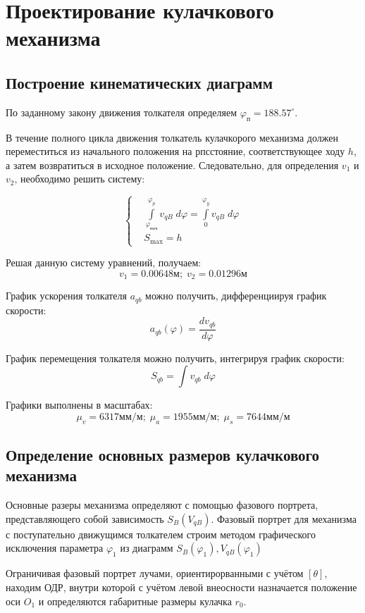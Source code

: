 \section{Проектирование кулачкового механизма}

\subsection{Построение кинематических диаграмм}

По заданному закону движения толкателя определяем $\varphi_п = 188.57^{\circ}$.

В течение полного цикла движения толкатель кулачкорого механизма должен переместиться из начального положения на рпсстояние, соответствующее ходу $h$, а затем возвратиться в исходное положение. Следовательно, для определения $v_1$ и $v_2$, необходимо решить систему:

\begin{equation}
	\left\{\begin{aligned}
	& \int\limits_{\varphi_{нач}}^{\varphi_p} v_{qB} \; d \varphi =  \int\limits_{0}^{\varphi_y} v_{qB} \; d \varphi \\ 
	& S_{\max} = h
	\end{aligned}\right.
\end{equation}

Решая данную систему уравнений, получаем: $$ v_1 = 0.00648 м; \; v_2 = 0.01296 м $$

График ускорения толкателя $a_{qb}$ можно получить, дифференциируя график скорости: $$a_{qb}(\varphi) = \frac{d v_{qb}}{d \varphi}$$

График перемещения толкателя можно получить, интегрируя график скорости: $$ S_{qb} = \int v_{qb} \; d \varphi $$

Графики выполнены в масштабах: $$ \mu_v = 6317 мм/м; \; \mu_a = 1955 мм/м; \; \mu_s = 7644 мм/м$$

\subsection{Определение основных размеров кулачкового механизма}

Основные разеры механизма определяют с помощью фазового портрета, представляющего собой зависимость $S_B(V_{qB})$. Фазовый портрет для механизма с поступательно движущимся толкателем строим методом графического исключения параметра $\varphi_1$ из диаграмм $S_B(\varphi_1), V_{qB}(\varphi_1)$

Ограничивая фазовый портрет лучами, ориентирорванными с учётом $ [ \theta ] $, находим ОДР, внутри которой с учётом левой внеосности назначается положение оси $O_1$ и определяются габаритные размеры кулачка $r_0$.

